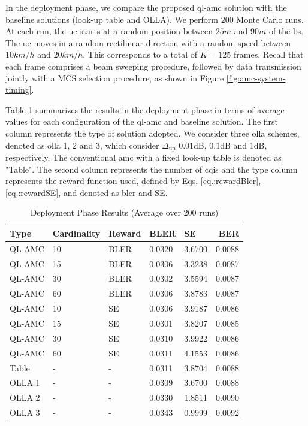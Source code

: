 In the deployment phase, we compare the proposed \gls{ql-amc} solution with the baseline solutions (look-up table and OLLA).
%
We perform $200$ Monte Carlo runs. At each run, the \gls{ue} starts at a random position between $25m$ and $90m$ of the \gls{bs}.
%
The \gls{ue} moves in a random rectilinear direction with a random speed between $10km/h$ and $20km/h$. This corresponds to a total of $K=125$ frames. Recall that each frame comprises a beam sweeping procedure, followed by data transmission jointly with a MCS selection procedure, as shown in Figure \ref{fig:amc-system-timing}.
%


Table \ref{tab:amc-deploy-results} summarizes the results in the deployment phase in terms of average values for each configuration of the \gls{ql-amc} and baseline solution.
%
The first column represents the type of solution adopted.
%
%
We consider three \gls{olla} schemes, denoted as \gls{olla} 1, 2 and 3, which consider $\Delta_{\text{up}}$ 0.01dB, 0.1dB and 1dB, respectively.
%
The conventional \gls{amc} with a fixed look-up table is denoted as "Table".
%
The second column represents the number of \gls{cqi}s and the type column represents the reward function used, defined by Eqs. \eqref{eq.:rewardBler}, \eqref{eq.:rewardSE}, and denoted as \gls{bler} and SE.
%

\begin{table}[tb]
\centering
\caption{Deployment Phase Results (Average over 200 runs)}
\label{tab:amc-deploy-results}
\begin{tabularx}{\columnwidth}{l X X X X r}
  \toprule
  Type    & Cardinality &      Reward  &  BLER &     SE  &    BER \\
  \midrule
   QL-AMC &     10 &           BLER   & 0.0320 &  3.6700 & 0.0088 \\
   QL-AMC &     15 &           BLER   & 0.0306 &  3.3238 & 0.0087 \\
   QL-AMC &     30 &           BLER   & 0.0302 &  3.5594 & 0.0087 \\
   QL-AMC &     60 &           BLER   & 0.0306 &  3.8783 & 0.0087 \\
   QL-AMC &     10 &           SE     & 0.0306 &  3.9187 & 0.0086 \\
   QL-AMC &     15 &           SE     & 0.0301 &  3.8207 & 0.0085 \\
   QL-AMC &     30 &           SE     & 0.0310 &  3.9922 & 0.0086 \\
   QL-AMC &     60 &           SE     & 0.0311 &  4.1553 & 0.0086 \\
    Table &      - &           -      & 0.0311 &  3.8704 & 0.0088 \\
   OLLA 1 &      - &           -      & 0.0309 &  3.6700 & 0.0088 \\
   OLLA 2 &      - &           -      & 0.0330 &  1.8511 & 0.0090 \\
   OLLA 3 &      - &           -      & 0.0343 &  0.9999 & 0.0092 \\
  \bottomrule
\end{tabularx}
\end{table}


